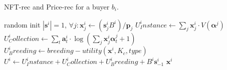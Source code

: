 \documentclass[conference]{IEEEtran}
\theoremstyle{plain}
\begin{document}
\begin{algorithm}[t]
    \small
    \caption{NFT-rec and Price-rec for a buyer $b_i$.}
    \label{alg:find-demand}
    \begin{algorithmic}[1]
        \State random init $|\mathbf{s}^i| = 1$, $\forall j: \mathbf{x}^i_j \gets (\mathbf{s}^i_j B^i)/\mathbf{p}_j$
            \State $U^i_Instance\gets \sum_j \mathbf{x}^i_j\cdot V(\bm{\alpha}^j)$
            \State $U^i_Collection\gets \sum_t \mathbf{a}^i_t \cdot \log \left(\sum_j \mathbf{x}^i_j \bm{\alpha}^j_t + 1\right)$
            \State $U^i_Breeding\gets breeding-utility(\mathbf{x}^i, K_c, type)$
            \State $U^i\gets U^i_Instance + U^i_Collection +  U^i_Breeding + B^i\mathbf{s}^i_{-1}$
        \EndFor
        \State \Return $\mathbf{x}^i$
    \EndProcedure
    \EndProcedure
    \end{algorithmic}
\end{algorithm}
\end{document}
